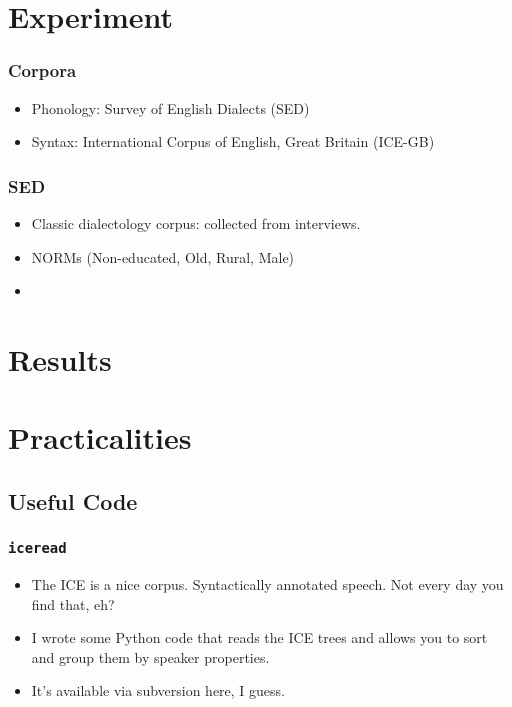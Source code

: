 \documentclass{beamer}
\begin{document}
\section{Experiment}
\begin{frame}
  \frametitle{Corpora}
  \begin{itemize}
  \item Phonology: Survey of English Dialects (SED)
  \item Syntax: International Corpus of English, Great Britain
    (ICE-GB)
  \end{itemize}
\end{frame}
\begin{frame}
  \frametitle{SED}
  \begin{itemize}
  \item Classic dialectology corpus: collected from interviews.
  \item NORMs (Non-educated, Old, Rural, Male)
  \item 
  \end{itemize}
\end{frame}
\section{Results}

\section{Practicalities}
\subsection{Useful Code}
\begin{frame}
  \frametitle{\tt iceread}
  \begin{itemize}
  \item The ICE is a nice corpus. Syntactically annotated speech. Not
    every day you find that, eh?
  \item I wrote some Python code that reads the ICE trees and allows you
    to sort and group them by speaker properties.
  \item It's available via subversion here, I guess.
  \end{itemize}
\end{frame}
\end{document}
